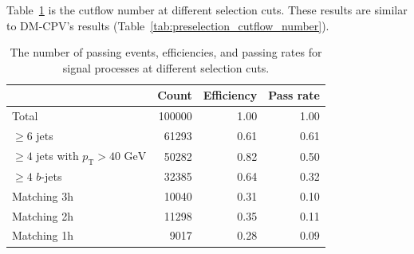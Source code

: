 \documentclass[12pt]{article}
\begin{document}
    Table~\ref{tab:preselection_cutflow_number_trsm_420_280} is the cutflow number at different selection cuts. These results are similar to DM-CPV's results (Table~\ref{tab:preselection_cutflow_number}).
    \begin{table}[htpb]
        \centering
        \caption{The number of passing events, efficiencies, and passing rates for signal processes at different selection cuts.}
        \label{tab:preselection_cutflow_number_trsm_420_280}
        \begin{tabular}{l|rrr}
                                                         & Count  & Efficiency & Pass rate \\ \hline
        Total                                            & 100000 & 1.00       & 1.00      \\
        $\ge 6$ jets                                     &  61293 & 0.61       & 0.61      \\
        $\ge 4$ jets with $p_{\text{T}} > \text{40 GeV}$ &  50282 & 0.82       & 0.50      \\
        $\ge 4$ $b$-jets                                 &  32385 & 0.64       & 0.32      \\ \hline
        Matching 3h                                      &  10040 & 0.31       & 0.10      \\
        Matching 2h                                      &  11298 & 0.35       & 0.11      \\
        Matching 1h                                      &   9017 & 0.28       & 0.09      \\
        \end{tabular}
    \end{table}
\end{document}
